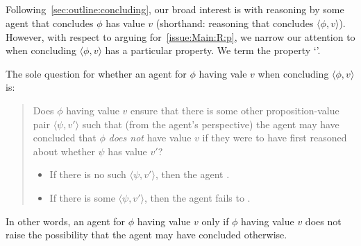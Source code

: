 \subsection{}
\label{sec:csn2}

\begin{note}[Introduction]
  Following~\autoref{sec:outline:concluding}, our broad interest is with reasoning by some agent that concludes \(\phi\) has value \(v\) (shorthand: reasoning that concludes \(\langle \phi,v \rangle\)).
  However, with respect to arguing for~\autoref{issue:Main:R:p}, we narrow our attention to when concluding \(\langle \phi,v \rangle\) has a particular property.
  We term the property `\csN{}'.

  The sole question for whether an agent \csV{} for \(\phi\) having vale \(v\) when concluding \(\langle \phi, v \rangle\) is:
  \begin{quote}
    Does \(\phi\) having value \(v\) ensure that there is some other proposition-value pair \(\langle \psi,v' \rangle\) such that (from the agent's perspective) the agent may have concluded that \(\phi\) \emph{does not} have value \(v\) if they were to have first reasoned about whether \(\psi\) has value \(v'\)?
    \begin{itemize}
    \item If there is no such \(\langle \psi,v' \rangle\), then the agent \csN{}.
    \item If there is some \(\langle \psi,v' \rangle\), then the agent fails to \csN{}.
    \end{itemize}
  \end{quote}

  In other words, an agent \csV{} for \(\phi\) having value \(v\) only if \(\phi\) having value \(v\) does not raise the possibility that the agent may have concluded otherwise.
\end{note}

